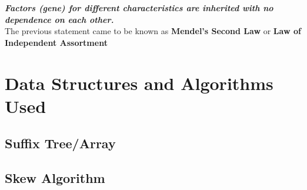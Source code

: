 \documentclass[12pt, lettersize]{article}
\begin{document}
\textsl{\textbf{Factors (gene) for different characteristics are inherited with no dependence on each other.}} \\

The previous statement came to be known as \textbf{Mendel's Second Law} or \textbf{Law of Independent Assortment}


\section{Data Structures and Algorithms Used}

\subsection{Suffix Tree/Array}

\subsection{Skew Algorithm}

\printglossaries
\end{document}
